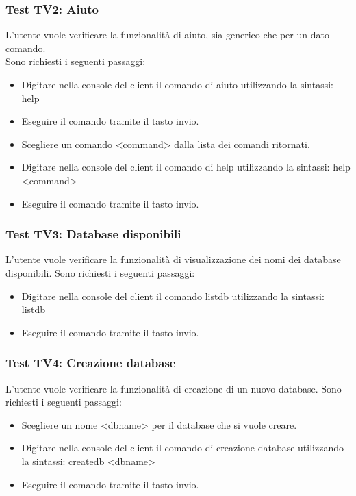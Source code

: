 \documentclass[a4paper]{article}
\begin{document}
		\subsubsection{Test TV2: Aiuto}
		L'utente vuole verificare la funzionalità di aiuto, sia generico che per un dato comando.\\
		Sono richiesti i seguenti passaggi:
		\begin{itemize}
			\item Digitare nella console del client il comando di aiuto utilizzando la sintassi: help
			\item Eseguire il comando tramite il tasto invio.
			\item Scegliere un comando <command> dalla lista dei comandi ritornati.
			\item Digitare nella console del client il comando di help utilizzando la sintassi: help <command>
			\item Eseguire il comando tramite il tasto invio.
		\end{itemize}
		
		\subsubsection{Test TV3: Database disponibili}
		L'utente vuole verificare la funzionalità di visualizzazione dei nomi dei database disponibili.
		Sono richiesti i seguenti passaggi:
		\begin{itemize}
			\item Digitare nella console del client il comando listdb utilizzando la sintassi: listdb
			\item Eseguire il comando tramite il tasto invio.
		\end{itemize}
		
		\subsubsection{Test TV4: Creazione database}
		L'utente vuole verificare la funzionalità di creazione di un nuovo database.
		Sono richiesti i seguenti passaggi:
		\begin{itemize}
			\item Scegliere un nome <dbname> per il database che si vuole creare.
			\item Digitare nella console del client il comando di creazione database utilizzando la sintassi: createdb <dbname>
			\item Eseguire il comando tramite il tasto invio.
		\end{itemize}
		
\end{document}
